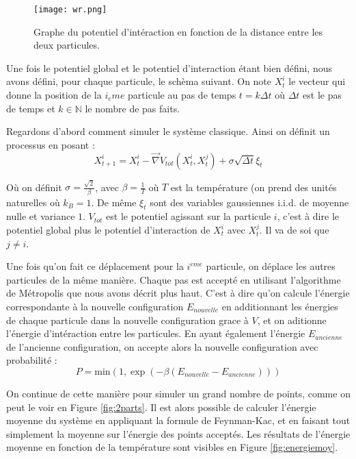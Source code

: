 \documentclass[11pt]{article}
\theoremstyle{definition}
\theoremstyle{remark}
\begin{document}
\begin{figure}[h]
\centering
\texttt{[image: wr.png]}
\caption{Graphe du potentiel d'intéraction en fonction de la distance entre les deux particules.}\label{fig:inter}
\end{figure} 

Une fois le potentiel global et le potentiel d'interaction étant bien défini, nous avons défini, pour chaque particule, le schèma suivant. On note $X^{i}_t$ le vecteur qui donne la position de la $i_eme$ particule au pas de temps $t=k\Delta t$ où $\Delta t$ est le pas de temps et $k\in \mathbb{N}$ le nombre de pas faits.

Regardons d'abord comment simuler le système classique. Ainsi on définit un processus en posant : 
\begin{equation}
X^{i}_{t+1}=X^{i}_t-\vec{\nabla}V_{tot}(X^{i}_t,X^j_t)+\sigma \sqrt{\Delta t}\xi_t
\end{equation} 

Où on définit $\sigma =\frac{\sqrt{2}}{\beta}$, avec $\beta=\frac{1}{T}$ où $T$ est la température (on prend des unités naturelles où $k_B=1$. De même $\xi_t$ sont des variables gaussiennes i.i.d. de moyenne nulle et variance $1$. $V_{tot}$ est le potentiel agissant sur la particule $i$, c'est à dire le potentiel global plus le potentiel d'interaction de $X^{i}_t$ avec $X^{j}_t$. Il va de soi que $j\neq i$.

Une fois qu'on fait ce déplacement pour la $i^{eme}$ particule, on déplace les autres particules de la même manière. Chaque pas est accepté en utilisant l'algorithme de Métropolis que nous avons décrit plus haut. C'est à dire qu'on calcule l'énergie correspondante à la nouvelle configuration $E_{nouvelle}$ en additionnant les énergies de chaque particule dans la nouvelle configuration grace à $V$, et on aditionne l'énergie d'intéraction entre les particules. En ayant également l'énergie $E_{ancienne}$ de l'ancienne configuration, on accepte alors la nouvelle configuration avec probabilité : 
\begin{equation}
P=\mathrm{min}(1,\exp \left(-\beta \left(E_{nouvelle}-E_{ancienne}\right)\right))
\end{equation}

On continue de cette manière pour simuler un grand nombre de points, comme on peut le voir en Figure \ref{fig:2parts}. Il est alors possible de calculer l'énergie moyenne du système en appliquant la formule de Feynman-Kac, et en faisant tout simplement la moyenne sur l'énergie des points acceptés. Les résultats de l'énergie moyenne en fonction de la température sont visibles en Figure \ref{fig:energiemoy}.
\end{document}
